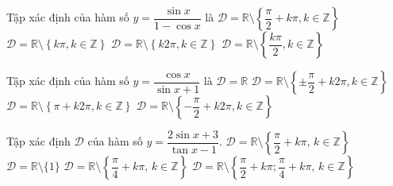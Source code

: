\begin{ex}%
	Tập xác định của hàm số $y=\dfrac{\sin x}{1-\cos x}$  là
	 \choice
		{$\mathscr{D}=\mathbb{R}\setminus  \left\{\dfrac{\pi}{2}+k\pi,k\in \mathbb{Z}\right\}$}
		 {$\mathscr{D}=\mathbb{R}\setminus \left\{k\pi,k\in \mathbb{Z}\right\}$}
		{\True $\mathscr{D}=\mathbb{R}\setminus  \left\{k2\pi,k\in \mathbb{Z}\right\}$}
		{$\mathscr{D}=\mathbb{R}\setminus \left\{\dfrac{k\pi}{2},k\in \mathbb{Z}\right\}$} 
\end{ex}

\begin{ex}%
	Tập xác định của hàm số $y=\dfrac{\cos x}{\sin x+1}$ là 
	\choice 
		 {$\mathscr{D}=\mathbb{R}$}
		{$\mathscr{D}=\mathbb{R}\setminus  \left\{\pm \dfrac{\pi}{2}+k2\pi,k\in \mathbb{Z} \right\}$}
		{$\mathscr{D}=\mathbb{R}\setminus \left\{\pi+k2\pi,k\in  \mathbb{Z} \right\}$}
		{\True $\mathscr{D}=\mathbb{R}\setminus  \left\{-\dfrac{\pi}{2}+k2\pi,k\in \mathbb{Z} \right\}$}
\end{ex}

\begin{ex}%
	Tập xác định $\mathscr{D}$ của hàm số  $y=\dfrac{2\sin x+3}{\tan x-1}$.
	\choice 
		{$\mathscr{D}=\mathbb{R}\setminus\left\{\dfrac{\pi}{2}+k\pi,\,  k\in\mathbb{Z}\right\}$}
		{$\mathscr{D}=\mathbb{R}\setminus  \{1\}$}
		{$\mathscr{D}=\mathbb{R}\setminus\left\{\dfrac{\pi}{4}+k\pi,\, k\in\mathbb{Z}\right\}$} 
		{\True $\mathscr{D}=\mathbb{R}\setminus \left\{\dfrac{\pi}{2}+k\pi;\dfrac{\pi}{4}+k\pi,\,  k\in\mathbb{Z}\right\}$}
\end{ex}

